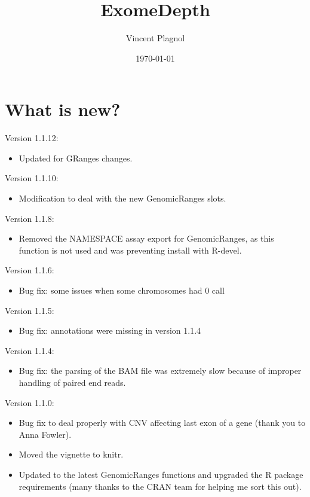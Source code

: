 \documentclass[10pt]{article}
\title{ExomeDepth}
\author{Vincent Plagnol}
\date{\today}
\begin{document}
\maketitle

\tableofcontents

\section{What is new?}

Version 1.1.12:
\begin{itemize}
\item Updated for GRanges changes.
\end{itemize}

Version 1.1.10:
\begin{itemize}
\item Modification to deal with the new GenomicRanges slots.
\end{itemize}

Version 1.1.8:
\begin{itemize}
\item Removed the NAMESPACE assay export for GenomicRanges, as this function is not used and was preventing install with R-devel.
\end{itemize}

Version 1.1.6:
\begin{itemize}
\item Bug fix: some issues when some chromosomes had 0 call
\end{itemize}

Version 1.1.5:
\begin{itemize}
\item Bug fix: annotations were missing in version 1.1.4
\end{itemize}

Version 1.1.4:
\begin{itemize}
\item Bug fix: the parsing of the BAM file was extremely slow because of improper handling of paired end reads.
\end{itemize}


Version 1.1.0:
\begin{itemize}
\item Bug fix to deal properly with CNV affecting last exon of a gene (thank you to Anna Fowler).
\item Moved the vignette to knitr.
\item Updated to the latest GenomicRanges functions and upgraded the R package requirements (many thanks to the CRAN team for helping me sort this out).
\end{itemize}
\end{document}

